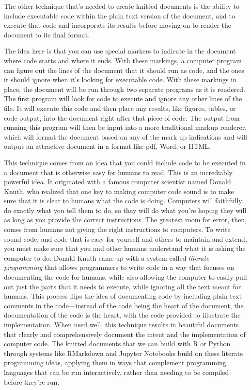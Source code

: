 \documentclass[]{tufte-book}
\begin{document}
The other technique that's needed to create knitted documents is the ability to
include executable code within the plain text version of the document, and to
execute that code and incorporate its results before moving on to render the
document to its final format.

The idea here is that you can use special markers to indicate in the document
where code starts and where it ends. With these markings, a computer program can
figure out the lines of the document that it should run as code, and the ones it
should ignore when it's looking for executable code. With these markings in
place, the document will be run through two separate programs as it is rendered.
The first program will look for code to execute and ignore any other lines of
the file. It will execute this code and then place any results, like figures,
tables, or code output, into the document right after that piece of code. The
output from running this program will then be input into a more traditional
markup renderer, which will format the document based on any of the mark up
indications and will output an attractive document in a format like pdf,
Word, or HTML.

This technique comes from an idea that you could include code to be executed in
a document that is otherwise easy for humans to read. This is an incrediably
powerful idea. It originated with a famous computer scientist named Donald
Knuth, who realized that one key to making computer code sound is to make sure
that it is clear to humans what the code is doing. Computers will faithfully do
exactly what you tell them to do, so they will do what you're hoping they will
as long as you provide the correct instructions. The greatest room for error,
then, comes from humans not giving the right instructions to computers. To
write sound code, and code that is easy for yourself and others to maintain and
extend, you must make sure that you and other humans understand what it is
asking the computer to do. Donald Knuth came up with a system called \emph{literate
programming} that allows programmers to write code in a way that focuses on
documenting the code for humans, while also allowing the computer to easily
pull out just the parts that it needs to execute, while ignoring all the text
meant for humans. This process flips the idea of documenting code by including
plain text comments in the code---instead of the code being the heart of the
document, the documentation of the code is the heart, with the code provided
to illustrate the implementation. When used well, this technique results in
beautiful documents that clearly and comprehensively document the intent and
the implementation of computer code. The knitted documents that we can build
with R or Python through systems like RMarkdown and Jupyter Notebooks build
on these literate programming ideas, applying them in ways that complement
programming languages that can be run interactively, rather than needing to
be compiled before they're run.
\end{document}
